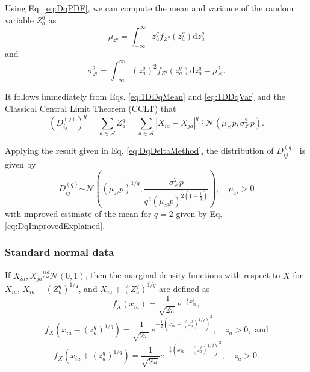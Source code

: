 \documentclass[10pt,letterpaper]{article}\usepackage[]{graphicx}\usepackage[]{color}
\begin{document}
Using Eq. \ref{eq:DqPDF}, we can compute the mean and variance of the random variable $Z^q_a$ as
%
\begin{equation}\label{eq:1DDqMean}
\mu_{z^q} = \int_{-\infty}^{\infty} z^q_a f_{Z^q}(z^q_a) \text{d}z^q_a
\end{equation}
%
and 
%
\begin{equation}\label{eq:1DDqVar}
\sigma^2_{z^q} = \int_{-\infty}^{\infty} \left(z^q_a\right)^2 f_{Z^q}(z^q_a) \text{d}z^q_a - \mu^2_{z^q}.
\end{equation}

It follows immediately from Eqs. \ref{eq:1DDqMean} and \ref{eq:1DDqVar} and the Classical Central Limit Theorem (CCLT) that
%
\begin{equation}\label{eq:DqDistr}
\left(D^{(q)}_{ij}\right)^q = \sum_{a \in \mathcal{A}} Z^q_a = \sum_{a \in \mathcal{A}} |X_{ia} - X_{ja}|^q \overset{.}{\sim} \mathcal{N}\left(\mu_{z^q}p,\sigma^2_{z^q}p\right).
\end{equation}

Applying the result given in Eq. \ref{eq:DqDeltaMethod}, the distribution of $D^{(q)}_{ij}$ is given by
%
\begin{equation}\label{eq:DDistr}
D^{(q)}_{ij} \overset{.}{\sim} \mathcal{N}\left(\left(\mu_{z^q}p\right)^{1/q},\frac{\sigma^2_{z^q}p}{q^2\left(\mu_{z^q}p\right)^{2\left(1 - \frac{1}{q}\right)}}\right), \quad \mu_{z^q} > 0
\end{equation}
%
with improved estimate of the mean for $q=2$ given by Eq. \ref{eq:DqImprovedExplained}.

\subsubsection{Standard normal data}

If $X_{ia},X_{ja} \overset{iid}{\sim} \mathcal{N}(0,1)$, then the marginal density functions with respect to $X$ for $X_{ia}$, $X_{ia} - \left(Z^q_a\right)^{1/q}$, and $X_{ia} + \left(Z^q_a\right)^{1/q}$ are defined as
%
\begin{equation}\label{eq:normalXmarg}
f_X(x_{ia}) = \frac{1}{\sqrt{2\pi}}e^{-\frac{1}{2}x^2_{ia}},
\end{equation}
%
\begin{equation}\label{eq:normalXMinusZmarg}
f_X\left(x_{ia} - \left(z^q_a\right)^{1/q}\right) = \frac{1}{\sqrt{2\pi}}e^{-\frac{1}{2}\left(x_{ia} - \left(z^q_a\right)^{1/q}\right)^2}, \quad z_a > 0, \text{ and}
\end{equation}
%
\begin{equation}\label{eq:normalXPlusZmarg}
f_X\left(x_{ia} + \left(z^q_a\right)^{1/q}\right) = \frac{1}{\sqrt{2\pi}}e^{-\frac{1}{2}\left(x_{ia} + \left(z^q_a\right)^{1/q}\right)^2}, \quad z_a > 0.
\end{equation}
\end{document}
